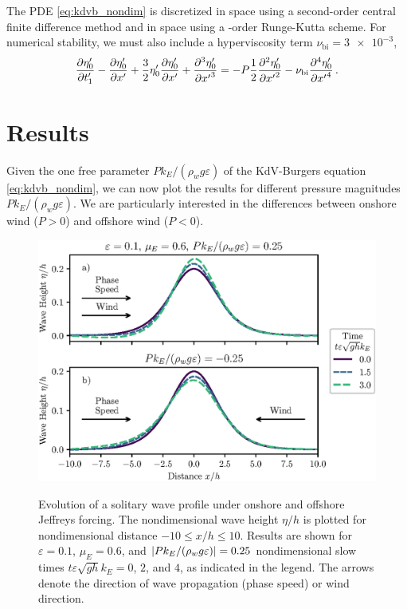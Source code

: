 \documentclass{jfm}
\renewcommand*{\epsilon}{\varepsilon}
\begin{document}
The PDE \cref{eq:kdvb_nondim} is discretized in space using a
second-order central finite difference method and in space using a
-order Runge-Kutta scheme.
For numerical stability, we must also include a hyperviscosity term
$\nu_{\text{bi}} = \num{3e-3}$,
\begin{equation}
  \pdv{\eta'_0}{t'_1} - \pdv{\eta'_0}{x'} + \frac{3}{2}
  \eta'_0 \pdv{\eta'_0}{x'} + \pdv[3]{\eta'_0}{{x'}} =
  -P \frac{1}{2} \pdv[2]{\eta'_0}{{x'}} - \nu_{\text{bi}}
  \pdv[4]{\eta'_0}{{x'}} \,.
\end{equation}

\section{\label{sec:results} Results}
Given the one free parameter $P k_E/(\rho_w g \epsilon)$ of the
KdV-Burgers equation \cref{eq:kdvb_nondim}, we can now plot the results
for different pressure magnitudes $P k_E/(\rho_w g \epsilon)$.
We are particularly interested in the differences between onshore wind
($P > 0$) and offshore wind ($P < 0$).

\begin{figure}
  \centering
  { %
    \label{fig:snapshots_solitary:a}
    \label{fig:snapshots_solitary:b}
  }
  \includegraphics{Snapshots-Positive-Negative.eps}
  \caption{
    Evolution of a solitary wave profile under
    onshore and
    offshore Jeffreys forcing.
    The nondimensional wave height $\eta/h$ is plotted for
    nondimensional distance $-10 \le x/h \le 10$.
    Results are shown for $\epsilon=0.1$, $\mu_E = 0.6$, and $\abs{P
    k_E/(\rho_w g \epsilon)} = 0.25$ nondimensional slow times $t
    \epsilon \sqrt{gh} k_E = 0$, $2$, and $4$, as indicated in the
    legend.
    The arrows denote the direction of wave propagation (phase speed) or
    wind direction.
  }\label{fig:snapshots_solitary}
\end{figure}
\end{document}
